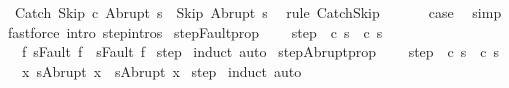 \begin{isabellebody}
\ {\isachardoublequoteopen}{\isasymGamma}{\isasymturnstile}\ {\isacharparenleft}Catch\ Skip\ c\ Abrupt\ s{\isacharparenright}\ {\isasymrightarrow}\ {\isacharparenleft}Skip{\isacharcomma}\ Abrupt\ s{\isacharparenright}{\isachardoublequoteclose}\ \isamarkupfalse%
\ {\isacharparenleft}rule\ CatchSkip{\isacharparenright}\ \isanewline
\ \ \isamarkupfalse%
\ \isamarkupfalse%
\ {\isacharquery}case\ \isamarkupfalse%
\ simp\isanewline
{}\isamarkupfalse%
\ {\isacharparenleft}fastforce\ intro{\isacharcolon}\ step{\isachardot}intros{\isacharparenright}{\isacharplus}%
\endisatagproof
{\isafoldproof}%
%
\isadelimproof
\isanewline
%
\endisadelimproof
\isanewline
{}\isamarkupfalse%
\ step{\isacharunderscore}Fault{\isacharunderscore}prop{\isacharcolon}\ \isanewline
\ \ \ step{\isacharcolon}\ {\isachardoublequoteopen}{\isasymGamma}{\isasymturnstile}\ {\isacharparenleft}c{\isacharcomma}\ s{\isacharparenright}\ {\isasymrightarrow}\ {\isacharparenleft}c{\isacharprime}{\isacharcomma}\ s{\isacharprime}{\isacharparenright}{\isachardoublequoteclose}\isanewline
\ \ \ {\isachardoublequoteopen}{\isasymAnd}f{\isachardot}\ s{\isacharequal}Fault\ f\ {\isasymLongrightarrow}\ s{\isacharprime}{\isacharequal}Fault\ f{\isachardoublequoteclose}\isanewline
%
\isadelimproof
%
\endisadelimproof
%
\isatagproof
{}\isamarkupfalse%
\ step\isanewline
{}\isamarkupfalse%
\ {\isacharparenleft}induct{\isacharparenright}\ auto%
\endisatagproof
{\isafoldproof}%
%
\isadelimproof
\isanewline
%
\endisadelimproof
\isanewline
{}\isamarkupfalse%
\ step{\isacharunderscore}Abrupt{\isacharunderscore}prop{\isacharcolon}\ \isanewline
\ \ \ step{\isacharcolon}\ {\isachardoublequoteopen}{\isasymGamma}{\isasymturnstile}\ {\isacharparenleft}c{\isacharcomma}\ s{\isacharparenright}\ {\isasymrightarrow}\ {\isacharparenleft}c{\isacharprime}{\isacharcomma}\ s{\isacharprime}{\isacharparenright}{\isachardoublequoteclose}\isanewline
\ \ \ {\isachardoublequoteopen}{\isasymAnd}x{\isachardot}\ s{\isacharequal}Abrupt\ x\ {\isasymLongrightarrow}\ s{\isacharprime}{\isacharequal}Abrupt\ x{\isachardoublequoteclose}\isanewline
%
\isadelimproof
%
\endisadelimproof
%
\isatagproof
{}\isamarkupfalse%
\ step\isanewline
{}\isamarkupfalse%
\ {\isacharparenleft}induct{\isacharparenright}\ auto%
\endisatagproof
{\isafoldproof}%
%
\isadelimproof
\isanewline
%
\endisadelimproof

\end{isabellebody}
